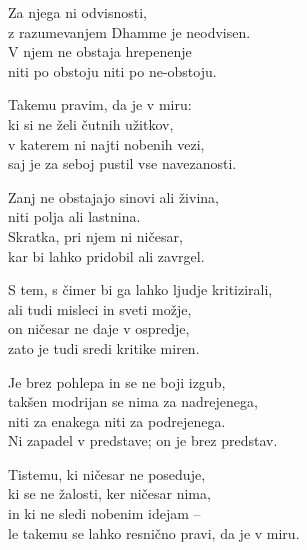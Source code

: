 Za njega ni odvisnosti,\\
z razumevanjem Dhamme je neodvisen.\\
V njem ne obstaja hrepenenje\\
niti po obstoju niti po ne-obstoju.

Takemu pravim, da je v miru:\\
ki si ne želi čutnih užitkov,\\
v katerem ni najti nobenih vezi,\\
saj je za seboj pustil vse navezanosti.

Zanj ne obstajajo sinovi ali živina,\\
niti polja ali lastnina.\\
Skratka, pri njem ni ničesar,\\
kar bi lahko pridobil ali zavrgel.

S tem, s čimer bi ga lahko ljudje kritizirali,\\
ali tudi misleci in sveti možje,\\
on ničesar ne daje v ospredje,\\
zato je tudi sredi kritike miren.

Je brez pohlepa in se ne boji izgub,\\
takšen modrijan se nima za nadrejenega,\\
niti za enakega niti za podrejenega.\\
Ni zapadel v predstave; on je brez predstav.

Tistemu, ki ničesar ne poseduje,\\
ki se ne žalosti, ker ničesar nima,\\
in ki ne sledi nobenim idejam --\\
le takemu se lahko resnično pravi, da je v miru.

